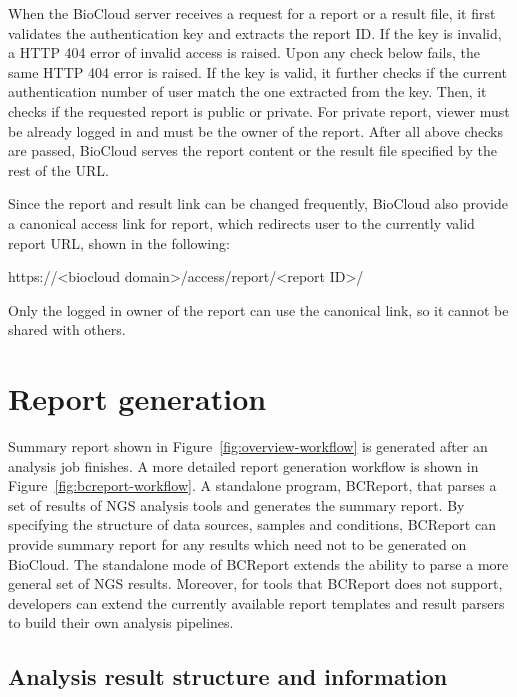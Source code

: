 When the BioCloud server receives a request for a report or a result file, it
first validates the authentication key and extracts the report ID. If the key
is invalid, a HTTP 404 error of invalid access is raised. Upon any check below
fails, the same HTTP 404 error is raised. If the key is valid, it further
checks if the current authentication number of user match the one extracted
from the key. Then, it checks if the requested report is public or private. For
private report, viewer must be already logged in and must be the owner of the
report. After all above checks are passed, BioCloud serves the report content
or the result file specified by the rest of the URL.

Since the report and result link can be changed frequently, BioCloud also
provide a canonical access link for report, which redirects user to the
currently valid report URL, shown in the following:

\begin{CVerbatim}[fontsize=\small]
https://<biocloud domain>/access/report/<report ID>/
\end{CVerbatim}

\vspace{-1em}\noindent
Only the logged in owner of the report can use the canonical link, so it cannot
be shared with others.



\section{Report generation}
\label{s:report-generation}

Summary report shown in Figure~\ref{fig:overview-workflow} is generated after
an analysis job finishes. A more detailed report generation workflow is shown
in Figure~\ref{fig:bcreport-workflow}. A standalone program, BCReport, that
parses a set of results of NGS analysis tools and generates the summary report.
By specifying the structure of data sources, samples and conditions, BCReport
can provide summary report for any results which need not to be generated on
BioCloud. The standalone mode of BCReport extends the ability to parse a more
general set of NGS results. Moreover, for tools that BCReport does not support,
developers can extend the currently available report templates and result
parsers to build their own analysis pipelines.




\subsection{Analysis result structure and information}

